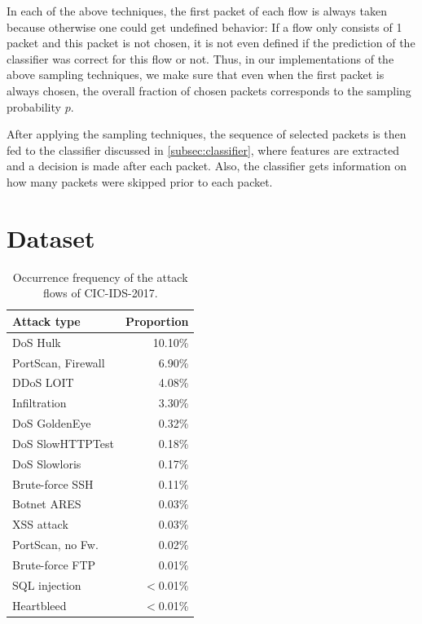 \documentclass[conference]{IEEEtran}
\newcommand\note[2]{{\color{#1}#2}}
\begin{document}
In each of the above techniques, the first packet of each flow is always taken because otherwise one could get undefined behavior: If a flow only consists of 1 packet and this packet is not chosen, it is not even defined if the prediction of the classifier was correct for this flow or not. Thus, in our implementations of the above sampling techniques, we make sure that even when the first packet is always chosen, the overall fraction of chosen packets corresponds to the sampling probability $p$.

After applying the sampling techniques, the sequence of selected packets is then fed to the classifier discussed in \autoref{subsec:classifier}, where features are extracted and a decision is made after each packet. Also, the classifier gets information on how many packets were skipped prior to each packet.


\section{Dataset}


\begin{table}[h]
\caption{Occurrence frequency of the attack flows of CIC-IDS-2017.}
\label{tab:occurrence}
\centering
\begin{tabular}{l r}
\toprule
Attack type & \hspace*{-4mm}Proportion \\ \midrule
DoS Hulk	&	10.10\%	\\
PortScan, Firewall	&	6.90\%	\\
DDoS LOIT	&	4.08\%	\\
Infiltration	&	3.30\%	\\
DoS GoldenEye	&	0.32\%	\\
DoS SlowHTTPTest	&	0.18\%	\\
DoS Slowloris	&	0.17\%	\\
Brute-force SSH	&	0.11\%	\\
Botnet ARES	&	0.03\%	\\
XSS attack	&	0.03\%	\\
PortScan, no Fw.	&	0.02\%	\\
Brute-force FTP	&	0.01\%	\\
SQL injection	&	$<$0.01\%	\\
Heartbleed	&	$<$0.01\%	\\
\bottomrule
\end{tabular}
\end{table}
\end{document}
